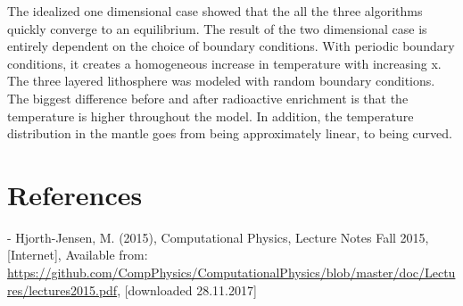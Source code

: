 \documentclass[10pt,a4paper]{article}
\begin{document}
\noindent The idealized one dimensional case showed that the all the three algorithms quickly converge to an equilibrium. The result of the two dimensional case is entirely dependent on the choice of boundary conditions. With periodic boundary conditions, it creates a homogeneous increase in temperature with increasing x. The three layered lithosphere was modeled with random boundary conditions. The biggest difference before and after radioactive enrichment is that the temperature is higher throughout the model. In addition, the temperature distribution in the mantle goes from being approximately linear, to being curved.  




\newpage
\section*{References}

\noindent - Hjorth-Jensen, M. (2015), Computational Physics, Lecture Notes Fall 2015, [Internet], Available from: \url{https://github.com/CompPhysics/ComputationalPhysics/blob/master/doc/Lectures/lectures2015.pdf}, [downloaded 28.11.2017]
\end{document}
